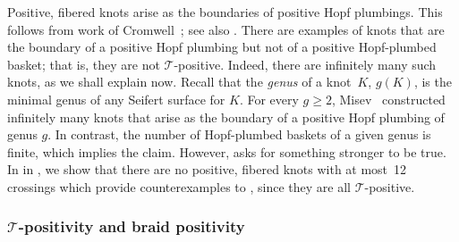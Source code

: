 \documentclass{amsart}
\theoremstyle{definition}
\theoremstyle{remark}
\theoremstyle{plain}
\newtheorem{proposition}[definition]{Proposition}
\newcommand{\T}{\mathcal{T}}
\begin{document}
Positive, fibered knots arise as the boundaries of positive Hopf plumbings. %
This follows from work of Cromwell~\cite[Theorem~5 and its corollaries]{cromwell:homo}; see also \cite[Figure~2]{kegel2024unknottingfiberedpositiveknots}. There are examples of knots that are the boundary of a positive Hopf plumbing but not of a positive Hopf-plumbed basket; that is, they are not $\T$-positive. Indeed, there are infinitely many such knots, as we shall explain now. Recall that the \emph{genus} of a knot~$K$, $g(K)$, is the minimal genus of any Seifert surface for $K$. For every $g \geq 2$, Misev~\cite{misev} constructed infinitely many knots that arise as the boundary of a positive Hopf plumbing of genus $g$. In contrast, the number of Hopf-plumbed baskets of a given genus is finite, which implies the claim. 
However,  asks for something stronger to be true. %
In  in , we show that there are no positive, fibered knots with at most~12 crossings which provide counterexamples to , since they are all $\T$-positive.

%

\subsubsection{\texorpdfstring{$\T$-positivity}{T-positivity} and braid positivity}\label{T-pos_braid_pos}
\end{document}
